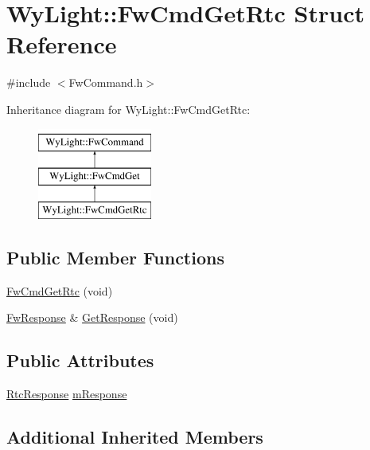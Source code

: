\hypertarget{struct_wy_light_1_1_fw_cmd_get_rtc}{\section{Wy\-Light\-:\-:Fw\-Cmd\-Get\-Rtc Struct Reference}
\label{struct_wy_light_1_1_fw_cmd_get_rtc}
}


{\ttfamily \#include $<$Fw\-Command.\-h$>$}

Inheritance diagram for Wy\-Light\-:\-:Fw\-Cmd\-Get\-Rtc\-:\begin{figure}[H]
\begin{center}
\leavevmode
\includegraphics[height=3.000000cm]{struct_wy_light_1_1_fw_cmd_get_rtc}
\end{center}
\end{figure}
\subsection*{Public Member Functions}
\begin{DoxyCompactItemize}
\item 
\hyperlink{struct_wy_light_1_1_fw_cmd_get_rtc_af98fa45b0f597139a9f21113e1a4abcf}{Fw\-Cmd\-Get\-Rtc} (void)
\item 
\hyperlink{class_wy_light_1_1_fw_response}{Fw\-Response} \& \hyperlink{struct_wy_light_1_1_fw_cmd_get_rtc_a75ca8ea9db3216ef36367546f7726951}{Get\-Response} (void)
\end{DoxyCompactItemize}
\subsection*{Public Attributes}
\begin{DoxyCompactItemize}
\item 
\hyperlink{class_wy_light_1_1_rtc_response}{Rtc\-Response} \hyperlink{struct_wy_light_1_1_fw_cmd_get_rtc_a50e0bf16f83ee888c2bd3e1fa5d6b8ff}{m\-Response}
\end{DoxyCompactItemize}
\subsection*{Additional Inherited Members}



